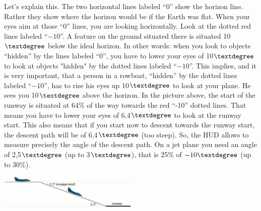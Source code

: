 \begin{itemize}
Let's explain this. The two horizontal lines labeled ``0'' show the
horizon line. Rather they show where the horizon would be if the Earth
was flat. When your eyes aim at those ``0'' lines, you are looking
horizontally. Look at the dotted red lines labeled ``$-10$''. A feature
on the ground situated there is situated 10$\textdegree$ below the
ideal horizon. In other words: when you look to objects ``hidden'' by
the lines labeled ``0'', you have to lower your eyes of 10$\textdegree$
to look at objects "hidden" by the dotted lines labeled ``$-10$''. This
implies, and it is very important, that a person in a rowboat,
``hidden'' by the dotted lines labeled ``$-10$'', has to rise his eyes
up 10$\textdegree$ to look at your plane. He sees you 10$\textdegree$
above the horizon. In the picture above, the start of the runway is
situated at 64\% of the way towards the red ``-10'' dotted lines. That
means you have to lower your eyes of 6,4$\textdegree$ to look at the
runway start. This also means that if you start now to descent towards
the runway start, the descent path will be of 6,4$\textdegree$ (too
steep). So, the  HUD allows to measure
precisely the angle of the descent path. On a jet plane you need an
angle of 2,5$\textdegree$ (up to 3$\textdegree$), that is 25\% of
$-10\textdegree$ (up to 30\%).


\begin{center}
\includegraphics[width=0.5\textwidth]{img/tut_55}
\end{center}


\end{itemize}
